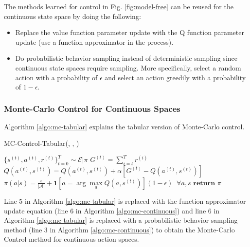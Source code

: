 \documentclass[11pt]{article}
\begin{document}
The methods learned for control in Fig. \ref{fig:model-free} can be reused for the continuous state space by doing the following:

\begin{itemize}
    \item Replace the value function parameter update with the Q function parameter update (use a function approximator in the process). 
    \item Do probabilistic behavior sampling instead of deterministic sampling since continuous state spaces require sampling. More specifically, select a random action with a probability of $\epsilon$ and select an action greedily with a probability of $1-\epsilon$.
\end{itemize}

\subsubsection{Monte-Carlo Control for Continuous Spaces}

Algorithm \ref{algo:mc-tabular} explains the tabular version of Monte-Carlo control.

\begin{algorithm}[H]
\caption{MC-Control-Tabular(\pi, \epsilon, \alpha)}
\label{algo:mc-tabular}
\begin{algorithmic}[1]
\vspace{0.15cm}
\STATE $\{s^{(t)}, a^{(t)}, r^{(t)}\}_{t=0}^T \sim \mathcal{E}|\pi$
\vspace{0.15cm}
\vspace{0.15cm}
\STATE $G^{(t)} = \sum\limits_{i=t}^T r^{(i)}$\\
\vspace{0.15cm}
\STATE $Q(a^{(t)}, s^{(t)}) = Q(a^{(t)}, s^{(t)}) + \alpha\left[ G^{(t)} - Q(a^{(t)}, s^{(t)})\right]$\\
\vspace{0.15cm}
\STATE $\pi(a|s) = \frac{\epsilon}{|\mathcal{A}|} + \mathbf{1}\left[ a = \arg \max\limits_a Q(a, s^{(t)})\right] (1-\epsilon)\;\; \forall a, s$
\vspace{0.15cm}
\ENDFOR
\ENDFOR
\STATE $\textbf{return } \pi$
\end{algorithmic}
\end{algorithm}

Line 5 in Algorithm \ref{algo:mc-tabular} is replaced with the function approximator update equation (line 6 in Algorithm \ref{algo:mc-continuous}) and line 6 in Algorithm \ref{algo:mc-tabular} is replaced with a probabilistic behavior sampling method (line 3 in Algorithm \ref{algo:mc-continuous}) to obtain the Monte-Carlo Control method for continuous action spaces.
\end{document}
